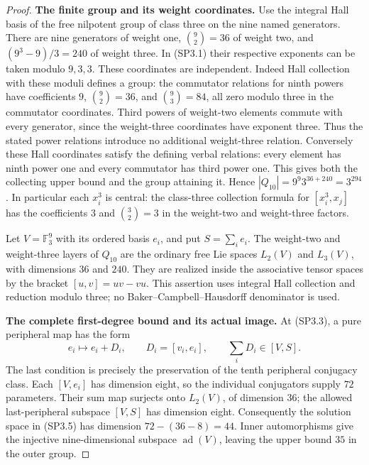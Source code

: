 \begin{proof}
\par\medskip\noindent\textbf{The finite group and its weight coordinates.}\quad
Use the integral Hall basis of the free nilpotent group of class
three on the nine named generators.  There are nine generators
of weight one, $\binom92=36$ of weight two, and
$(9^3-9)/3=240$ of weight three.  In (SP3.1) their respective
exponents can be taken modulo $9,3,3$.  These coordinates are
independent.  Indeed Hall collection with these moduli defines
a group: the commutator relations for ninth powers have
coefficients $9$, $\binom92=36$, and $\binom93=84$, all
zero modulo three in the commutator coordinates.  Third powers
of weight-two elements commute with every generator, since the
weight-three coordinates have exponent three.  Thus the stated
power relations introduce no additional weight-three relation.
Conversely these Hall coordinates satisfy the defining verbal
relations: every element has ninth power one and every
commutator has third power one.  This gives both the collecting
upper bound and the group attaining it.  Hence
$|Q_{10}|=9^9 3^{36+240}=3^{294}$.
In particular each $x_i^3$ is central: the class-three collection
formula for $[x_i^3,x_j]$ has the coefficients $3$ and
$\binom32=3$ in the weight-two and weight-three factors.

Let $V=\mathbb F_3^9$ with its ordered basis $e_i$, and put
$S=\sum_i e_i$.  The weight-two and weight-three layers of
$Q_{10}$ are the ordinary free Lie spaces $L_2(V)$ and $L_3(V)$,
with dimensions $36$ and $240$.  They are realized inside the
associative tensor spaces by the bracket $[u,v]=uv-vu$.
This assertion uses integral Hall collection and reduction
modulo three; no Baker--Campbell--Hausdorff denominator is used.

\par\medskip\noindent\textbf{The complete first-degree bound and its actual image.}\quad
At (SP3.3), a pure peripheral map has the form
\[
 e_i\longmapsto e_i+D_i,\qquad D_i=[v_i,e_i],
 \qquad \sum_iD_i\in[V,S].                              \tag{SP3.5}
\]
The last condition is precisely the preservation of the tenth
peripheral conjugacy class.  Each $[V,e_i]$ has dimension eight,
so the individual conjugators supply $72$ parameters.  Their
sum map surjects onto $L_2(V)$, of dimension $36$; the allowed
last-peripheral subspace $[V,S]$ has dimension eight.
Consequently the solution space in (SP3.5) has dimension
$72-(36-8)=44$.  Inner automorphisms give the injective
nine-dimensional subspace $\operatorname{ad}(V)$, leaving the
upper bound $35$ in the outer group.


\end{proof}
